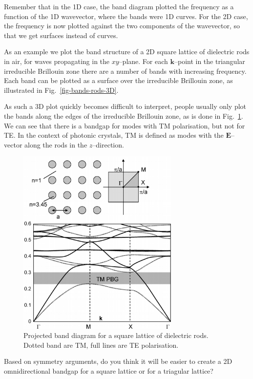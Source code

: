 Remember that in the 1D case, the band diagram plotted the frequency as a function of the 1D wavevector, where the bands were 1D curves. For the 2D case, the frequency is now plotted against the two components of the wavevector, so that we get surfaces instead of curves.

As an example we plot the band structure of a 2D square lattice of dielectric rods in air, for waves propagating in the $xy$--plane. For each ${\mathbf k}$--point in the triangular irreducible Brillouin zone there are a number of bands with increasing frequency. Each band can be plotted as a surface over the irreducible Brillouin zone, as illustrated in Fig.~\ref{fig-bands-rods-3D}.

As such a 3D plot quickly becomes difficult to interpret, people usually only plot the bands along the edges of the irreducible Brillouin zone, as is done in Fig.~\ref{fig-bands-rods}. We can see that there is a bandgap for modes with TM polarisation, but not for TE. In the context of photonic crystals, TM is defined as modes with the ${\mathbf E}$--vector along the rods in the $z$--direction.

\begin{figure}
\centering
\includegraphics[width=8cm]{symmetry/figures/square_bands}
\caption{Projected band diagram for a square lattice of dielectric rods. Dotted band are TM, full lines are TE polarisation.}
\label{fig-bands-rods}
\end{figure}

\begin{exer}
Based on symmetry arguments, do you think it will be easier to create a 2D omnidirectional bandgap for a square lattice or for a triagular lattice?
\end{exer}

